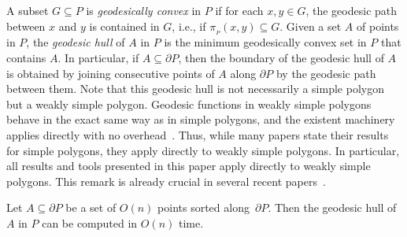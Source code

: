 \documentclass[a4paper,UKenglish]{socg-lipics-v2018}
\newcommand{\s}{\mathcal S}
\newcommand{\p}[3][P]{\ensuremath{\pi_{_{#1}}(#2, #3)}}
\newcommand{\cell}[2][P]{\ensuremath{\mathtt{Cell}_{\scriptscriptstyle #1}(#2)}}
\newcommand{\vd}[2][P]{\textsc{vd}(#2, #1)}
\begin{document}
A subset $G\subseteq P$ is \emph{geodesically convex} in $P$ if for each $x,y\in G$, the geodesic path between $x$ and $y$ is contained in $G$, i.e., if $\p{x}{y}\subseteq G$.
Given a set $A$ of points in $P$, the \emph{geodesic hull} of $A$ in $P$ is the minimum geodesically convex set in $P$ that contains $A$. 
In particular, if $A\subseteq \partial P$, then the boundary of the geodesic hull of $A$ is obtained by joining consecutive points of $A$ along $\partial P$ by the geodesic path between them. Note that this geodesic hull is not necessarily a simple polygon but a weakly simple polygon. 
Geodesic functions in weakly simple polygons behave in the exact same way as in simple polygons, and the existent machinery applies directly with no overhead~\cite{chang2014detecting}. 
Thus, while many papers state their results for simple polygons, they apply directly to weakly simple polygons. 
In particular, all results and tools presented in this paper apply directly to weakly simple polygons.
This remark is already crucial in several recent papers~\cite{oh2016computing,oh2016farthest}.

\begin{lemma}\label{lemma:Geodesic hull computation}
Let $A\subseteq \partial P$ be a set of $O(n)$ points sorted along~$\partial P$. 
Then the geodesic hull of $A$ in $P$ can be computed in $O(n)$ time.
\end{lemma}

%
\end{document}
